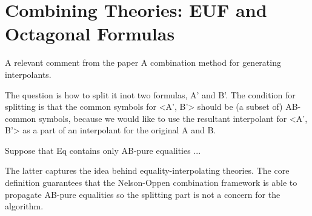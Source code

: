\chapter{Combining Theories: EUF and Octagonal Formulas}

A relevant comment from the paper A combination method for generating interpolants.

The question is how to split it inot two formulas, A' and B'. The condition for splitting is that
the common symbols for <A', B'> should be (a subset of) AB-common symbols, because we would like
to use the resultant interpolant for <A', B'> as a part of an interpolant
for the original A and B.

  Suppose that Eq contains only AB-pure equalities ...

  The latter captures the idea behind equality-interpolating theories. The core definition guarantees 
  that the Nelson-Oppen combination framework is able to propagate  
  AB-pure equalities so the splitting part is not a concern for the algorithm.


